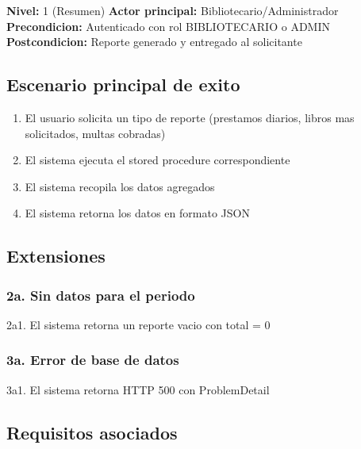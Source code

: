 \documentclass[
11pt,
a4paper,
]{report}
\providecommand{\tightlist}{%
	\setlength{\itemsep}{0pt}\setlength{\parskip}{0pt}}
\begin{document}
	\textbf{Nivel:} 1 (Resumen)
	\textbf{Actor principal:} Bibliotecario/Administrador
	\textbf{Precondicion:} Autenticado con rol BIBLIOTECARIO o ADMIN
	\textbf{Postcondicion:} Reporte generado y entregado al solicitante
	
	\hypertarget{escenario-principal-de-exito-2}{%
		\subsection{Escenario principal de exito}\label{escenario-principal-de-exito-2}}
	
	\begin{enumerate}
		\def\labelenumi{\arabic{enumi}.}
		\tightlist
		\item
		El usuario solicita un tipo de reporte (prestamos diarios, libros mas solicitados, multas cobradas)
		\item
		El sistema ejecuta el stored procedure correspondiente
		\item
		El sistema recopila los datos agregados
		\item
		El sistema retorna los datos en formato JSON
	\end{enumerate}
	
	\hypertarget{extensiones-4}{%
		\subsection{Extensiones}\label{extensiones-4}}
	
	\hypertarget{a.-sin-datos-para-el-periodo}{%
		\subsubsection{2a. Sin datos para el periodo}\label{a.-sin-datos-para-el-periodo}}
	
	2a1. El sistema retorna un reporte vacio con total = 0
	
	\hypertarget{a.-error-de-base-de-datos-1}{%
		\subsubsection{3a. Error de base de datos}\label{a.-error-de-base-de-datos-1}}
	
	3a1. El sistema retorna HTTP 500 con ProblemDetail
	
	\hypertarget{requisitos-asociados-4}{%
		\subsection{Requisitos asociados}\label{requisitos-asociados-4}}
	
\end{document}
